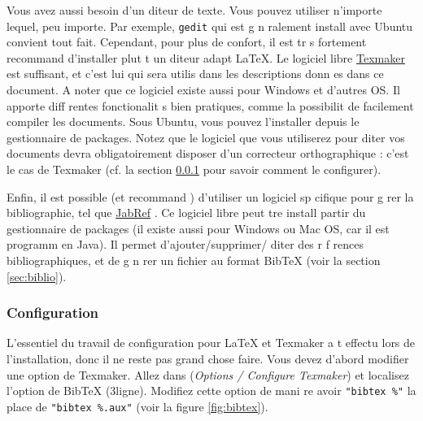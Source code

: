 \documentclass{article}
\begin{document}
Vous avez aussi besoin d'un  diteur de texte. Vous pouvez utiliser n'importe lequel, peu importe. Par exemple, \texttt{gedit} qui est g n ralement install  avec Ubuntu convient tout   fait. Cependant, pour plus de confort, il est tr s fortement recommand  d'installer plut t un  diteur adapt    \LaTeX{}. Le logiciel libre \href{http://www.xm1math.net/texmaker/}{Texmaker} \cite{Texmaker2011} est suffisant, et c'est lui qui sera utilis  dans les descriptions donn es dans ce document. A noter que ce logiciel existe aussi pour Windows et d'autres OS. Il apporte diff rentes fonctionalit s bien pratiques, comme la possibilit  de facilement compiler les documents. Sous Ubuntu, vous pouvez l'installer depuis le gestionnaire de packages. Notez que le logiciel que vous utiliserez pour  diter vos documents devra obligatoirement disposer d'un correcteur orthographique : c'est le cas de Texmaker (cf\@. la section \ref{sec:configuration} pour savoir comment le configurer).

Enfin, il est possible (et recommand ) d'utiliser un logiciel sp cifique pour g rer la bibliographie, tel que \href{http://jabref.sourceforge.net/}{JabRef} \cite{JabRef2008}. Ce logiciel libre peut  tre install    partir du gestionnaire de packages (il existe aussi pour Windows ou Mac OS, car il est programm  en Java). Il permet d'ajouter/supprimer/ diter des r f rences bibliographiques, et de g n rer un fichier au format BibTeX (voir la section \ref{sec:biblio}).
	
\subsubsection{Configuration}
\label{sec:configuration}
L'essentiel du travail de configuration pour \LaTeX{} et Texmaker a  t  effectu  lors de l'installation, donc il ne reste pas grand chose   faire. Vous devez d'abord modifier une option de Texmaker. Allez dans (\textit{Options / Configure Texmaker}) et localisez l'option de BibTeX (3\ieme ligne). Modifiez cette option de mani re   avoir \texttt{"bibtex \%"}   la place de \texttt{"bibtex \%.aux"} (voir la figure \ref{fig:bibtex}).
\end{document}
